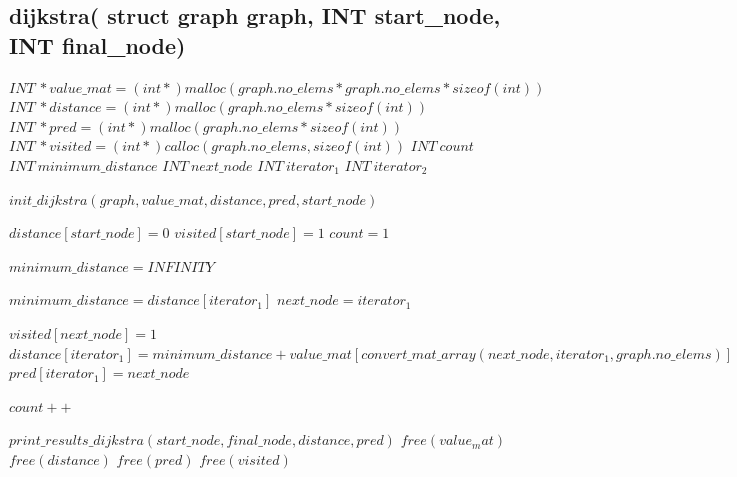 \documentclass[12]{article}
\begin{document}
\subsection{dijkstra( struct graph graph, INT start\_node, INT final\_node)}
\begin{algorithmic}[1]
    \STATE $INT\ *value\_mat = (int*) malloc(graph.no\_elems * graph.no\_elems * sizeof(int))$
    \STATE $INT\ *distance = (int*) malloc(graph.no\_elems * sizeof(int))$
    \STATE $INT\ *pred = (int*) malloc(graph.no\_elems * sizeof(int))$
    \STATE $INT\ *visited = (int*) calloc(graph.no\_elems, sizeof(int))$
    \STATE $INT\ count$
    \STATE $INT\ minimum\_distance$
    \STATE $INT\ next\_node$
    \STATE $INT\ iterator_1$
    \STATE $INT\ iterator_2$
    
    \STATE $init\_dijkstra(graph, value\_mat, distance, pred, start\_node)$
    
    \STATE $distance[start\_node] = 0$
    \STATE $visited[start\_node] = 1$
    \STATE $count = 1$
    
        \STATE $minimum\_distance = INFINITY$
        
                \STATE $minimum\_distance = distance[iterator_1]$
                \STATE $next\_node = iterator_1$
            \ENDIF
        \ENDFOR
                    
        \STATE $visited[next\_node] = 1$
                    \STATE $distance[iterator_1] = minimum\_distance +  value\_mat[convert\_mat\_array(next\_node, iterator_1, graph.no\_elems)]$
                    \STATE $pred[iterator_1] = next\_node$
                \ENDIF
            \ENDIF
        \ENDFOR

        \STATE $count++$
    \ENDWHILE

    \STATE $print\_results\_dijkstra(start\_node, final\_node, distance, pred)$
    \STATE $free(value_mat)$
    \STATE $free(distance)$
    \STATE $free(pred)$
    \STATE $free(visited)$

\end{algorithmic}
\end{document}

